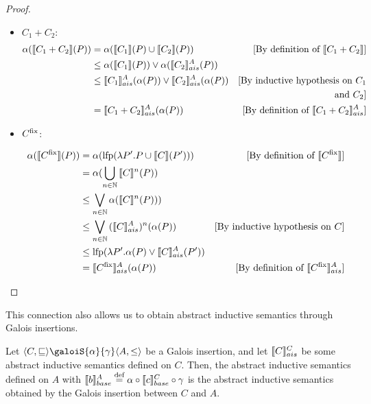 \documentclass[
  10pt,       %
  twoside,    %
  a4paper,    %
  english,    %
  tikz,       %
  openright,  %
]{book}
\begin{document}
\begin{proof}
\begin{itemize}
    \item $C_1 + C_2$:
      \begin{align*}
        \alpha(\sem{C_1 + C_2}(P))
          &= \alpha(\sem{C_1}(P) \cup \sem{C_2}(P))
          &\text{[By definition of $\sem{C_1 + C_2}$]}\\
          &\leq \alpha(\sem{C_1}(P)) \join \alpha(\asem{C_2}(P)) \\
          &\leq \asem{C_1}(\alpha(P)) \join \asem{C_2}(\alpha(P))
          &\text{[By inductive hypothesis on $C_1$} \\
          && \text{and $C_2$]} \\
          &= \asem{C_1 + C_2}(\alpha(P))
          &\text{[By definition of $\asem{C_1 + C_2}$]}\\
      \end{align*}
    
    \item $C^\fix$:

      \begin{align*}
        \alpha(\sem{C^\fix}(P) )
          &= \alpha(\lfp(\lambda P'. P \cup \sem{C}(P')))
          &\text{[By definition of $\sem{C^\fix}$]}\\
          &= \alpha(\bigcup_{n \in \mathbb{N}}{\sem{C}^n(P)}) \\
          &\leq \bigvee_{n \in \mathbb{N}}{\alpha(\sem{C}^n(P))}) \\
          &\leq \bigvee_{n \in \mathbb{N}}{(\asem{C})^n(\alpha(P))}
          &\text{[By inductive hypothesis on $C$]}\\
          &\leq \lfp(\lambda P'. \alpha(P) \join \asem{C}(P')) \\
          &= \asem{C^\fix}(\alpha(P)) 
          &\text{[By definition of $\asem{C^\fix}$]}\\
      \end{align*}
  \end{itemize}
\end{proof}

This connection also allows us to obtain abstract inductive semantics through 
Galois insertions.

\begin{definition}
  \label{def:aisgi}
  Let $\langle C, \sqsubseteq \rangle \galoiS{\alpha}{\gamma} \langle A, \leq
  \rangle$ be a Galois insertion, and let $\asem[C]{C}$ be some abstract
  inductive semantics defined on $C$. Then, the abstract inductive semantics
  defined on $A$ with $\bsem{b}^A \defeq \alpha \circ \bsem{c}^C \circ \gamma$
  is the abstract inductive semantics obtained by the Galois insertion between
  $C$ and $A$.
\end{definition}
\end{document}
